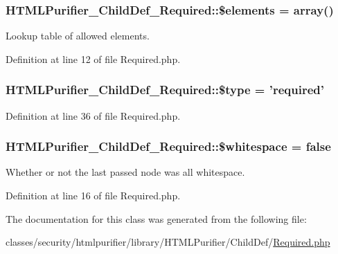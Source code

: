 \hypertarget{classHTMLPurifier__ChildDef__Required_aedbceaeb60dd657ff3538589c21149a6}{
\subsubsection[{\$elements}]{\setlength{\rightskip}{0pt plus 5cm}H\+T\+M\+L\+Purifier\+\_\+\+Child\+Def\+\_\+\+Required\+::\$elements = array()}}\label{classHTMLPurifier__ChildDef__Required_aedbceaeb60dd657ff3538589c21149a6}
Lookup table of allowed elements. 

Definition at line 12 of file Required.\+php.

\hypertarget{classHTMLPurifier__ChildDef__Required_a2f815a4acff5b44801bc21f353871c62}{
\subsubsection[{\$type}]{\setlength{\rightskip}{0pt plus 5cm}H\+T\+M\+L\+Purifier\+\_\+\+Child\+Def\+\_\+\+Required\+::\$type = 'required'}}\label{classHTMLPurifier__ChildDef__Required_a2f815a4acff5b44801bc21f353871c62}


Definition at line 36 of file Required.\+php.

\hypertarget{classHTMLPurifier__ChildDef__Required_a80312b67fca1c07ab6bb11baad938b2e}{
\subsubsection[{\$whitespace}]{\setlength{\rightskip}{0pt plus 5cm}H\+T\+M\+L\+Purifier\+\_\+\+Child\+Def\+\_\+\+Required\+::\$whitespace = false\hspace{0.3cm}{\ttfamily [protected]}}}\label{classHTMLPurifier__ChildDef__Required_a80312b67fca1c07ab6bb11baad938b2e}
Whether or not the last passed node was all whitespace. 

Definition at line 16 of file Required.\+php.



The documentation for this class was generated from the following file\+:\begin{DoxyCompactItemize}
\item 
classes/security/htmlpurifier/library/\+H\+T\+M\+L\+Purifier/\+Child\+Def/\hyperlink{Required_8php}{Required.\+php}\end{DoxyCompactItemize}

